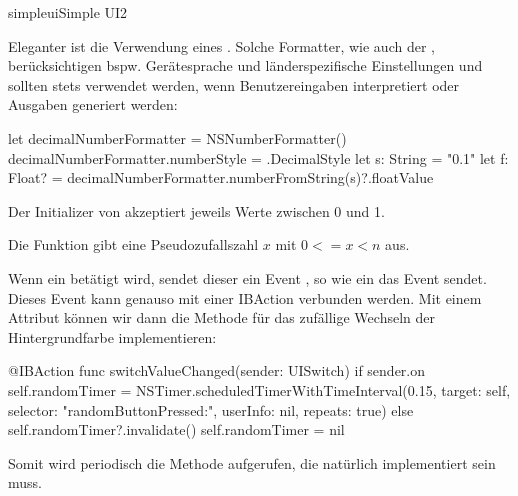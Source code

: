 \documentclass[parskip=half, final]{scrreprt}
\begin{document}
\begin{lecture}
\begin{exc}
\begin{excitem}{simpleui}{Simple UI}{2}
\begin{exchinweise}
	Eleganter ist die Verwendung eines . Solche Formatter, wie auch der , berücksichtigen bspw. Gerätesprache und länderspezifische Einstellungen und sollten stets verwendet werden, wenn Benutzereingaben interpretiert oder Ausgaben generiert werden:
	\begin{swiftcode}
    let decimalNumberFormatter = NSNumberFormatter()
    decimalNumberFormatter.numberStyle = .DecimalStyle
    let s: String = "0.1"
    let f: Float? = decimalNumberFormatter.numberFromString(s)?.floatValue
	\end{swiftcode}


\item Der Initializer  von  akzeptiert jeweils Werte zwischen 0 und 1.
\item Die Funktion  gibt eine Pseudozufallszahl $x$ mit $0<=x<n$ aus.
\item Wenn ein  betätigt wird, sendet dieser ein Event , so wie ein  das Event  sendet. Dieses Event kann genauso mit einer IBAction verbunden werden. Mit einem Attribut  können wir dann die Methode für das zufällige Wechseln der Hintergrundfarbe implementieren:
\begin{swiftcode}
@IBAction func switchValueChanged(sender: UISwitch) {
    if sender.on {
        self.randomTimer = NSTimer.scheduledTimerWithTimeInterval(0.15, target: self, selector: "randomButtonPressed:", userInfo: nil, repeats: true)
    } else {
        self.randomTimer?.invalidate()
        self.randomTimer = nil
    }
}
\end{swiftcode}
	Somit wird periodisch die Methode  aufgerufen, die natürlich implementiert sein muss.

\end{exchinweise}

\end{excitem}

\end{exc}


\end{lecture}
\end{document}
